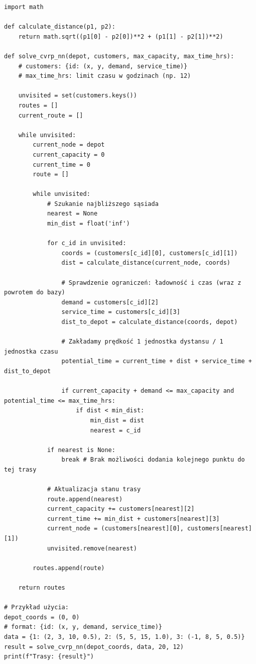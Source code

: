 \begin{verbatim}
import math

def calculate_distance(p1, p2):
    return math.sqrt((p1[0] - p2[0])**2 + (p1[1] - p2[1])**2)

def solve_cvrp_nn(depot, customers, max_capacity, max_time_hrs):
    # customers: {id: (x, y, demand, service_time)}
    # max_time_hrs: limit czasu w godzinach (np. 12)
    
    unvisited = set(customers.keys())
    routes = []
    current_route = []
    
    while unvisited:
        current_node = depot
        current_capacity = 0
        current_time = 0
        route = []
        
        while unvisited:
            # Szukanie najbliższego sąsiada
            nearest = None
            min_dist = float('inf')
            
            for c_id in unvisited:
                coords = (customers[c_id][0], customers[c_id][1])
                dist = calculate_distance(current_node, coords)
                
                # Sprawdzenie ograniczeń: ładowność i czas (wraz z powrotem do bazy)
                demand = customers[c_id][2]
                service_time = customers[c_id][3]
                dist_to_depot = calculate_distance(coords, depot)
                
                # Zakładamy prędkość 1 jednostka dystansu / 1 jednostka czasu
                potential_time = current_time + dist + service_time + dist_to_depot
                
                if current_capacity + demand <= max_capacity and potential_time <= max_time_hrs:
                    if dist < min_dist:
                        min_dist = dist
                        nearest = c_id
            
            if nearest is None:
                break # Brak możliwości dodania kolejnego punktu do tej trasy
            
            # Aktualizacja stanu trasy
            route.append(nearest)
            current_capacity += customers[nearest][2]
            current_time += min_dist + customers[nearest][3]
            current_node = (customers[nearest][0], customers[nearest][1])
            unvisited.remove(nearest)
            
        routes.append(route)
        
    return routes

# Przykład użycia:
depot_coords = (0, 0)
# format: {id: (x, y, demand, service_time)}
data = {1: (2, 3, 10, 0.5), 2: (5, 5, 15, 1.0), 3: (-1, 8, 5, 0.5)}
result = solve_cvrp_nn(depot_coords, data, 20, 12)
print(f"Trasy: {result}")
\end{verbatim}

